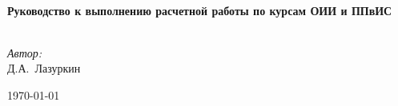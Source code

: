 
\begin{titlepage}

  \begin{center}

    \vspace{6cm}

    \HRule \\[0.4cm]
    {\huge \bfseries Руководство к выполнению расчетной работы по курсам ОИИ и ППвИС}\\[0.4cm]

    \HRule \\[1.5cm]

    \begin{minipage}{0.4\textwidth}
      \begin{flushright} \large
        \emph{Автор:} \\
        Д.А.~Лазуркин
      \end{flushright}
    \end{minipage}

    \vfill

    {\large \today}

  \end{center}

\end{titlepage}

